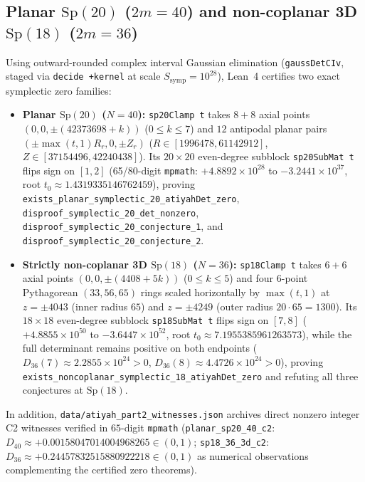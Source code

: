 \documentclass[11pt,reqno]{amsart}
\theoremstyle{remark}
\begin{document}
\subsection{Planar $\mathrm{Sp}(20)$ ($2m = 40$) and non-coplanar 3D $\mathrm{Sp}(18)$ ($2m = 36$)}
Using outward-rounded complex interval Gaussian elimination (\texttt{gaussDetCIv}, staged via \texttt{decide +kernel} at scale $S_{\mathrm{symp}} = 10^{28}$), Lean~4 certifies two exact symplectic zero families:
\begin{itemize}
  \item \textbf{Planar $\mathrm{Sp}(20)$ ($N = 40$):} \texttt{sp20Clamp t} takes $8+8$ axial points $(0, 0, \pm(42373698 + k))$ ($0 \le k \le 7$) and $12$ antipodal planar pairs $(\pm \max(t,1) R_r, 0, \pm Z_r)$ ($R \in [1996478, 61142912]$, $Z \in [37154496, 42240438]$). Its $20 \times 20$ even-degree subblock \texttt{sp20SubMat t} flips sign on $[1, 2]$ (65/80-digit \texttt{mpmath}: $+4.8892 \times 10^{28}$ to $-3.2441 \times 10^{37}$, root $t_0 \approx 1.4319335146762459$), proving \texttt{exists\_planar\_symplectic\_20\_atiyahDet\_zero}, \texttt{disproof\_symplectic\_20\_det\_nonzero}, \texttt{disproof\_symplectic\_20\_conjecture\_1}, and \texttt{disproof\_symplectic\_20\_conjecture\_2}.
  \item \textbf{Strictly non-coplanar 3D $\mathrm{Sp}(18)$ ($N = 36$):} \texttt{sp18Clamp t} takes $6+6$ axial points $(0, 0, \pm(4408 + 5k))$ ($0 \le k \le 5$) and four $6$-point Pythagorean $(33, 56, 65)$ rings scaled horizontally by $\max(t,1)$ at $z = \pm 4043$ (inner radius $65$) and $z = \pm 4249$ (outer radius $20 \cdot 65 = 1300$). Its $18 \times 18$ even-degree subblock \texttt{sp18SubMat t} flips sign on $[7, 8]$ ($+4.8855 \times 10^{50}$ to $-3.6447 \times 10^{52}$, root $t_0 \approx 7.1955385961263573$), while the full determinant remains positive on both endpoints ($D_{36}(7) \approx 2.2855 \times 10^{24} > 0$, $D_{36}(8) \approx 4.4726 \times 10^{24} > 0$), proving \texttt{exists\_noncoplanar\_symplectic\_18\_atiyahDet\_zero} and refuting all three conjectures at $\mathrm{Sp}(18)$.
\end{itemize}
In addition, \texttt{data/atiyah\_part2\_witnesses.json} archives direct nonzero integer C2 witnesses verified in $65$-digit \texttt{mpmath} (\texttt{planar\_sp20\_40\_c2}: $D_{40} \approx +0.00158047014004968265 \in (0,1)$; \texttt{sp18\_36\_3d\_c2}: $D_{36} \approx +0.24457832515880922218 \in (0,1)$ as numerical observations complementing the certified zero theorems).
\end{document}
